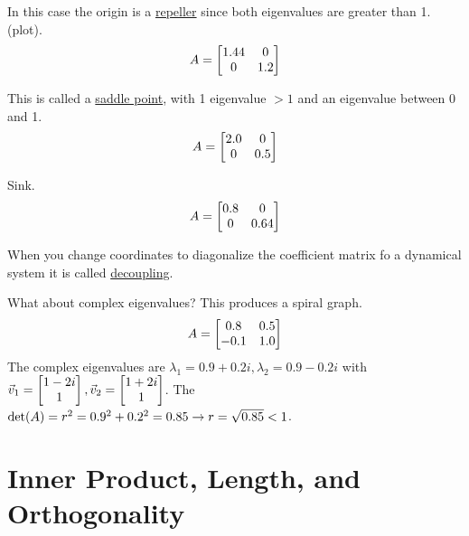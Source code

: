 \documentclass[10pt,a4paper]{article}
\begin{document}
\begin{example} In this case the origin is a \underline{repeller} since both eigenvalues are greater than 1. (plot).
	$$A = \begin{bmatrix}1.44 & 0 \\ 0 & 1.2\end{bmatrix}$$
\end{example}
\begin{example} This is called a \underline{saddle point}, with 1 eigenvalue $> 1$ and an eigenvalue between 0 and 1.
	$$A = \begin{bmatrix}2.0 & 0 \\ 0 & 0.5\end{bmatrix}$$
\end{example}
\begin{example} Sink.
	$$A = \begin{bmatrix}0.8 & 0 \\ 0 & 0.64\end{bmatrix}$$
\end{example}
When you change coordinates to diagonalize the coefficient matrix fo a dynamical system it is called \underline{decoupling}.

What about complex eigenvalues? This produces a spiral graph. $$A = \begin{bmatrix}0.8 & 0.5 \\ -0.1 & 1.0\end{bmatrix}$$
The complex eigenvalues are $\lambda_1 = 0.9 + 0.2i, \lambda_2 = 0.9 - 0.2i$ with $\vec{v}_1 = \begin{bmatrix}1-2i\\1\end{bmatrix}, \vec{v}_2 = \begin{bmatrix}1+2i\\1\end{bmatrix}$. The $\det(A) = r^2 = 0.9^2 + 0.2^2 = 0.85 \rightarrow r = \sqrt{0.85} < 1$.

\section{Inner Product, Length, and Orthogonality}
\end{document}
